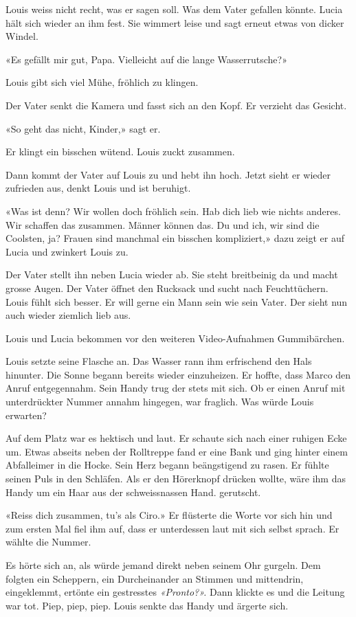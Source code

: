 {Louis weiss nicht recht, was er sagen soll. Was dem Vater gefallen könnte.
Lucia hält sich wieder an ihm fest. Sie wimmert leise und sagt erneut
etwas von dicker Windel.

«Es gefällt mir gut, Papa. Vielleicht auf die lange Wasserrutsche?»

Louis gibt sich viel Mühe, fröhlich zu klingen.

Der Vater senkt die Kamera und fasst sich an den Kopf. Er verzieht das
Gesicht.

«So geht das nicht, Kinder,» sagt er.

Er klingt ein bisschen wütend. Louis zuckt zusammen.

Dann kommt der Vater auf Louis zu und hebt ihn hoch. Jetzt sieht er wieder
zufrieden aus, denkt Louis und ist beruhigt.

«Was ist denn? Wir wollen doch fröhlich sein. Hab dich lieb wie nichts
anderes. Wir schaffen das zusammen. Männer können das. Du und ich, wir
sind die Coolsten, ja? Frauen sind manchmal ein bisschen kompliziert,»
dazu zeigt er auf Lucia und zwinkert Louis zu.

Der Vater stellt ihn neben Lucia wieder ab. Sie steht breitbeinig da und
macht grosse Augen. Der Vater öffnet den Rucksack und sucht nach
Feuchttüchern. Louis fühlt sich besser. Er will gerne ein Mann sein wie
sein Vater. Der sieht nun auch wieder ziemlich lieb aus.

Louis und Lucia bekommen vor den weiteren Video-Aufnahmen Gummibärchen.}

\sectionbreak

Louis setzte seine Flasche an. Das Wasser rann ihm erfrischend den Hals
hinunter. Die Sonne begann bereits wieder einzuheizen. Er hoffte, dass Marco den
Anruf entgegennahm. Sein Handy trug der stets mit sich. Ob er einen
Anruf mit unterdrückter Nummer annahm hingegen, war fraglich. Was würde
Louis erwarten?

Auf dem Platz war es hektisch und laut. Er schaute sich nach einer
ruhigen Ecke um. Etwas abseits neben der Rolltreppe fand er eine Bank und ging hinter einem
Abfalleimer in die Hocke.
Sein Herz begann beängstigend zu rasen. Er fühlte seinen Puls in den
Schläfen. Als er den Hörerknopf drücken wollte, wäre ihm das Handy
um ein Haar aus der schweissnassen Hand. gerutscht.

«Reiss dich zusammen, tu’s als Ciro.» Er flüsterte die Worte vor sich hin und zum ersten Mal fiel ihm auf, dass er unterdessen laut mit sich selbst sprach. Er wählte die Nummer.

Es hörte sich an, als würde jemand direkt neben seinem Ohr gurgeln. Dem folgten 
ein Scheppern, ein Durcheinander an Stimmen und mittendrin, eingeklemmt,
ertönte ein gestresstes \emph{«Pronto?».} Dann klickte es und die
Leitung war tot. Piep, piep, piep. Louis senkte das Handy und ärgerte sich.
